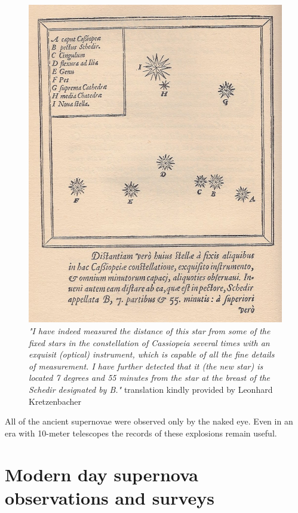 \begin{figure}[htbp] %
   \centering
   \includegraphics[width=\textwidth]{chapter_intro/plots/Tycho_Cas_SN1572.jpg} 
   \caption{\textit{"I have indeed measured the distance of this star from some of the fixed stars in the constellation of Cassiopeia several times with an
exquisit (optical) instrument, which is capable of all the fine details of measurement. I have further detected that it
(the new star) is located 7 degrees and 55 minutes from the star at the breast of the Schedir designated by B."} translation kindly provided by Leonhard Kretzenbacher}
   \label{fig:sn1572_tycho_chart}
\end{figure}



All of the ancient supernovae were observed only by the naked eye. Even in an era with 10-meter telescopes the records of these explosions remain useful.

\section{Modern day supernova observations and surveys}
\label{sec:surveys}

